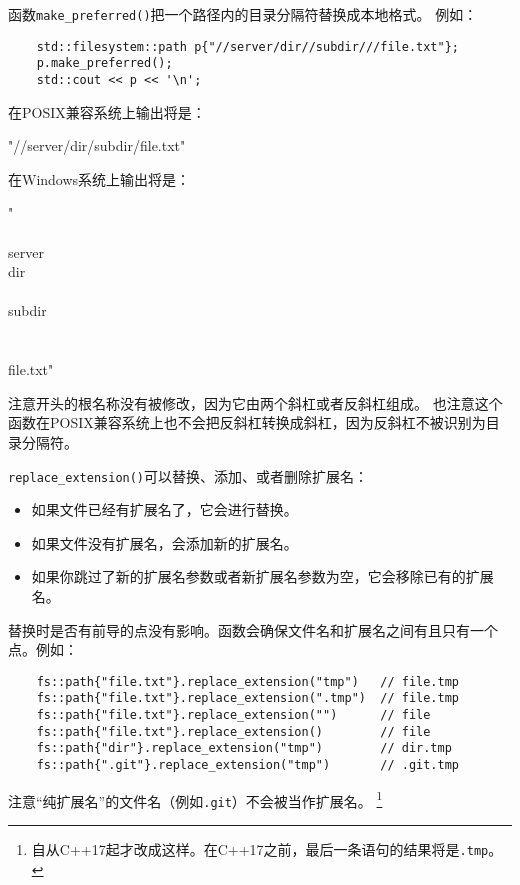 函数\texttt{make\_preferred()}把一个路径内的目录分隔符替换成本地格式。
例如：
\begin{lstlisting}
    std::filesystem::path p{"//server/dir//subdir///file.txt"};
    p.make_preferred();
    std::cout << p << '\n';
\end{lstlisting}
在POSIX兼容系统上输出将是：
\begin{blacklisting}
    "//server/dir/subdir/file.txt"
\end{blacklisting}
在Windows系统上输出将是：
\begin{blacklisting}
    "\\\\server\\dir\\\\subdir\\\\\\file.txt"
\end{blacklisting}
注意开头的根名称没有被修改，因为它由两个斜杠或者反斜杠组成。
也注意这个函数在POSIX兼容系统上也不会把反斜杠转换成斜杠，因为反斜杠不被识别为目录分隔符。

\texttt{replace\_extension()}可以替换、添加、或者删除扩展名：
\begin{itemize}
    \item 如果文件已经有扩展名了，它会进行替换。
    \item 如果文件没有扩展名，会添加新的扩展名。
    \item 如果你跳过了新的扩展名参数或者新扩展名参数为空，它会移除已有的扩展名。
\end{itemize}
替换时是否有前导的点没有影响。函数会确保文件名和扩展名之间有且只有一个点。例如：
\begin{lstlisting}
    fs::path{"file.txt"}.replace_extension("tmp")   // file.tmp
    fs::path{"file.txt"}.replace_extension(".tmp")  // file.tmp
    fs::path{"file.txt"}.replace_extension("")      // file
    fs::path{"file.txt"}.replace_extension()        // file
    fs::path{"dir"}.replace_extension("tmp")        // dir.tmp
    fs::path{".git"}.replace_extension("tmp")       // .git.tmp
\end{lstlisting}
注意“纯扩展名”的文件名（例如\texttt{.git}）不会被当作扩展名。
\footnote{自从C++17起才改成这样。在C++17之前，最后一条语句的结果将是\texttt{.tmp}。}

